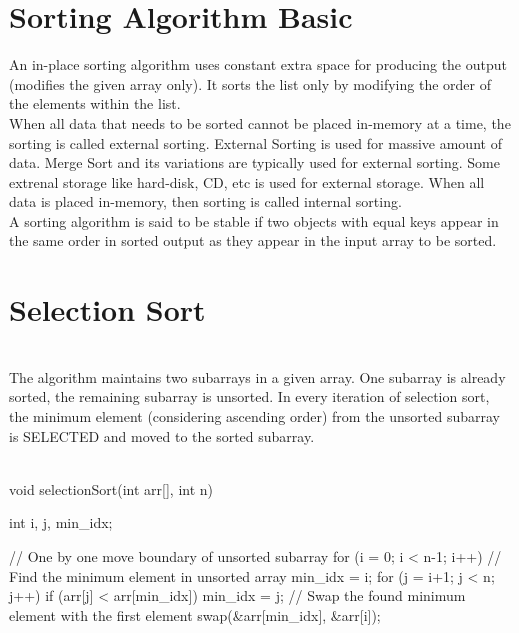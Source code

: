 \documentclass[a4paper]{article}
\begin{document}
\section{Sorting Algorithm Basic}
An in-place sorting algorithm uses constant extra space for producing the output (modifies the given array only). It sorts the list only by modifying the order of the elements within the list.\\
When all data that needs to be sorted cannot be placed in-memory at a time, the sorting is called external sorting. External Sorting is used for massive amount of data. Merge Sort and its variations are typically used for external sorting. Some extrenal storage like hard-disk, CD, etc is used for external storage.
When all data is placed in-memory, then sorting is called internal sorting.\\
A sorting algorithm is said to be stable if two objects with equal keys appear in the same order in sorted output as they appear in the input array to be sorted.\\


\section{Selection Sort}
 \\
The algorithm maintains two subarrays in a given array. One subarray is already sorted, the remaining subarray is unsorted. In every iteration of selection sort, the minimum element (considering ascending order) from the unsorted subarray is SELECTED and moved to the sorted subarray.\\

 \\
\begin{listing}
	void selectionSort(int arr[], int n)  
	{ 
    	int i, j, min_idx; 

		// One by one move boundary of unsorted subarray 
		for (i = 0; i < n-1; i++) 
    	{ 
        	// Find the minimum element in unsorted array 
        	min_idx = i; 
        	for (j = i+1; j < n; j++) 
        	{  if (arr[j] < arr[min_idx]) 
            	min_idx = j; 
        	}	
        	// Swap the found minimum element with the first element 
        	swap(&arr[min_idx], &arr[i]); 
    	}	 
	} 
\end{listing}
	
\end{document}
